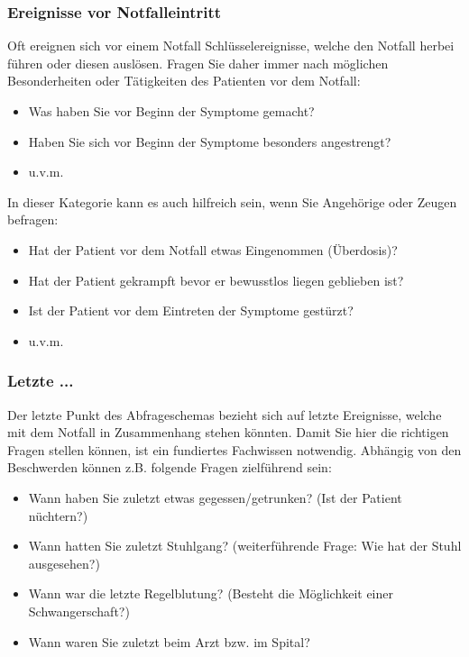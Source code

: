 \subsubsection{Ereignisse vor Notfalleintritt}
Oft ereignen sich vor einem Notfall Schlüsselereignisse, welche den Notfall herbei führen oder diesen auslösen. Fragen Sie daher immer nach möglichen Besonderheiten oder Tätigkeiten des Patienten vor dem Notfall:
\begin{itemize}
\item Was haben Sie vor Beginn der Symptome gemacht?
\item Haben Sie sich vor Beginn der Symptome besonders angestrengt?
\item u.v.m.
\end{itemize}
In dieser Kategorie kann es auch hilfreich sein, wenn Sie Angehörige oder Zeugen befragen:
\begin{itemize}
\item Hat der Patient vor dem Notfall etwas Eingenommen (Überdosis)?
\item Hat der Patient gekrampft bevor er bewusstlos liegen geblieben ist?
\item Ist der Patient vor dem Eintreten der Symptome gestürzt?
\item u.v.m.
\end{itemize}

\subsubsection{Letzte ...}
Der letzte Punkt des Abfrageschemas bezieht sich auf letzte Ereignisse, welche mit dem Notfall in Zusammenhang stehen könnten. Damit Sie hier die richtigen Fragen stellen können, ist ein fundiertes Fachwissen notwendig. Abhängig von den Beschwerden können z.B. folgende Fragen zielführend sein:
\begin{itemize}
\item Wann haben Sie zuletzt etwas gegessen/getrunken? (Ist der Patient nüchtern?)
\item Wann hatten Sie zuletzt Stuhlgang? (weiterführende Frage: Wie hat der Stuhl ausgesehen?)
\item Wann war die letzte Regelblutung? (Besteht die Möglichkeit einer Schwangerschaft?)
\item Wann waren Sie zuletzt beim Arzt bzw. im Spital?
\end{itemize}

